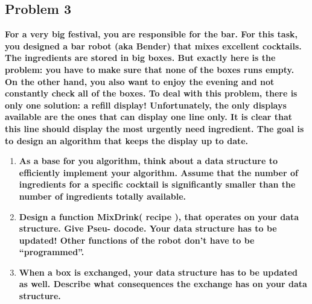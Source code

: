 \subsection{Problem 3}

\textbf{For a very big festival, you are responsible for the bar. For this task, you designed a bar robot (aka Bender) that mixes excellent cocktails. The ingredients are stored in big boxes. But exactly here is the problem: you have to make sure that none of the boxes runs empty. On the other hand, you also want to enjoy the evening and not constantly check all of the boxes. To deal with this problem, there is only one solution: a refill display! Unfortunately, the only displays available are the ones that can display one line only.
It is clear that this line should display the most urgently need ingredient. The goal is to design an algorithm that keeps the display up to date.}

\begin{enumerate}
    \item \textbf{As a base for you algorithm, think about a data structure to efficiently implement your algorithm. Assume that the number of ingredients for a specific cocktail is significantly smaller than the number of ingredients totally available.}

\item \textbf{Design a function MixDrink( recipe ), that operates on your data structure. Give Pseu- docode. Your data structure has to be updated! Other functions of the robot don’t have to be “programmed”.}

\item \textbf{When a box is exchanged, your data structure has to be updated as well. Describe what consequences the exchange has on your data structure.}

\end{enumerate}
